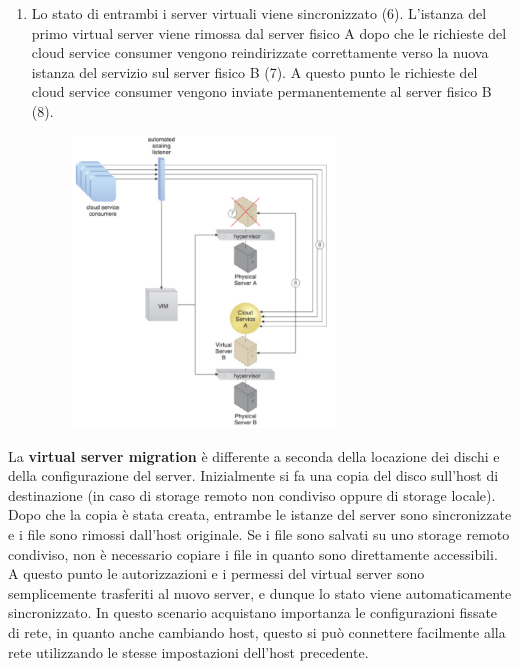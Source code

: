 \begin{enumerate}
    \item Lo stato di entrambi i server virtuali viene sincronizzato (6). L'istanza del primo virtual server viene rimossa dal server fisico A dopo che le richieste del cloud service consumer vengono reindirizzate correttamente verso la nuova istanza del servizio sul server fisico B (7). A questo punto le richieste del cloud service consumer vengono inviate permanentemente al server fisico B (8).
    
    \begin{figure}[htb!]
    \centering
    \includegraphics[width=7cm]{./Images/cap12/12.8.png}
    \end{figure}
    
\end{enumerate}

La \textbf{virtual server migration} è differente a seconda della locazione dei dischi e della configurazione del server. Inizialmente si fa una copia del disco sull'host di destinazione (in caso di storage remoto non condiviso oppure di storage locale). Dopo che la copia è stata creata, entrambe le istanze del server sono sincronizzate e i file sono rimossi dall'host originale. Se i file sono salvati su uno storage remoto condiviso, non è necessario copiare i file in quanto sono direttamente accessibili. A questo punto le autorizzazioni e i permessi del virtual server sono semplicemente trasferiti al nuovo server, e dunque lo stato viene automaticamente sincronizzato. In questo scenario acquistano importanza le configurazioni fissate di rete, in quanto anche cambiando host, questo si può connettere facilmente alla rete utilizzando le stesse impostazioni dell'host precedente.

